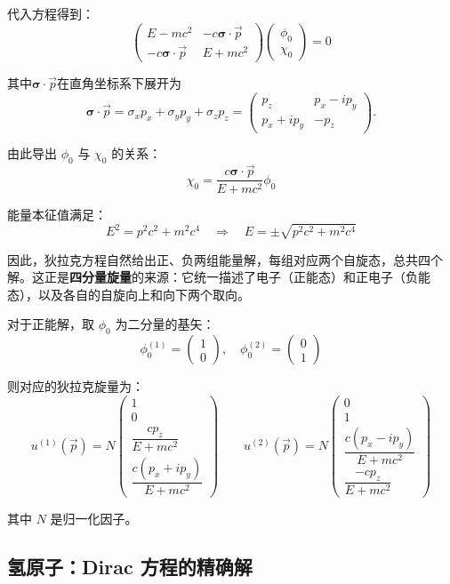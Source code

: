 \documentclass[UTF8]{ctexbook}
\begin{document}
代入方程得到：
\[
\begin{pmatrix} E - mc^2 & -c\boldsymbol{\sigma}\cdot\vec{p} \\ -c\boldsymbol{\sigma}\cdot\vec{p} & E + mc^2 \end{pmatrix} \begin{pmatrix} \phi_0 \\ \chi_0 \end{pmatrix} = 0
\]

其中$\boldsymbol{\sigma}\cdot\vec{p}$在直角坐标系下展开为
\[
\boldsymbol{\sigma}\cdot\vec{p}
=\sigma_x p_x+\sigma_y p_y+\sigma_z p_z
=\begin{pmatrix}
p_z & p_x-i p_y \\
p_x+i p_y & -p_z
\end{pmatrix}.
\]

由此导出 \(\phi_0\) 与 \(\chi_0\) 的关系：
\[
\chi_0 = \frac{c\boldsymbol{\sigma}\cdot\vec{p}}{E + mc^2} \phi_0
\]

能量本征值满足：
\[
E^2 = p^2c^2 + m^2c^4 \quad \Rightarrow \quad E = \pm\sqrt{p^2c^2 + m^2c^4}
\]

因此，狄拉克方程自然给出正、负两组能量解，每组对应两个自旋态，总共四个解。这正是\textbf{四分量旋量}的来源：它统一描述了电子（正能态）和正电子（负能态），以及各自的自旋向上和向下两个取向。

对于正能解，取 \(\phi_0\) 为二分量的基矢：
\[
\phi_0^{(1)} = \begin{pmatrix} 1 \\ 0 \end{pmatrix}, \quad \phi_0^{(2)} = \begin{pmatrix} 0 \\ 1 \end{pmatrix}
\]

则对应的狄拉克旋量为：
\[
u^{(1)}(\vec{p}) = N \begin{pmatrix} 1 \\ 0 \\ \dfrac{cp_z}{E+mc^2} \\ \dfrac{c(p_x+ip_y)}{E+mc^2} \end{pmatrix}
\qquad
u^{(2)}(\vec{p}) = N \begin{pmatrix} 0 \\ 1 \\ \dfrac{c(p_x-ip_y)}{E+mc^2} \\ \dfrac{-cp_z}{E+mc^2} \end{pmatrix}
\]

其中 \(N\) 是归一化因子。

\subsection{氢原子：Dirac 方程的精确解}
\end{document}
